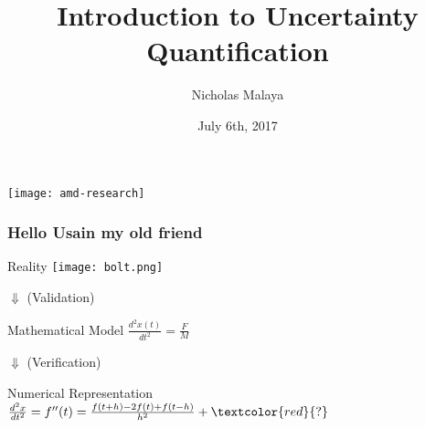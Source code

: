 \documentclass[mathserif]{beamer}
\date{July 6th, 2017}
\author[Malaya]{Nicholas Malaya}
\institute{
AMD Research \\
Advanced Micro Devices
}
\title[UQ]{Introduction to Uncertainty Quantification}
\begin{document}
\begin{frame}
%
 \titlepage
 \begin{flushright}
  \texttt{[image: amd-research]}\\
 \end{flushright}
%
\end{frame}
%
%
%
\begin{frame}
 \frametitle{Hello Usain my old friend}

 \begin{center}
  \center
      \begin{block}{Reality}
       \center
       \texttt{[image: bolt.png]}\\
       \end{block}
  $\Downarrow$ (Validation)
      \begin{block}{Mathematical Model}
       \center
       $\frac{d^2x(t)}{dt^2} = \frac{F}{M}$\\
      \end{block}
  $\Downarrow$ (Verification)
  \begin{block}{Numerical Representation}
   \center
   $\frac{d^2x}{dt^2} = f''(t) = \frac{f(t+h) - 2 f(t) + f(t-h)}{h^2} + \textcolor{red}{?}$
   \end{block}
 \end{center}
\end{frame}
%
\end{document}
